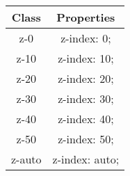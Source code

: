 \documentclass{report}
\begin{document}
    \pagebreak 
    \begin{center}
        \begin{tabular}{c|c}
            Class &Properties \\ 
            \hline
            z-0	&z-index: 0;\\
            z-10	&z-index: 10;\\
            z-20	&z-index: 20;\\
            z-30	&z-index: 30;\\
            z-40	&z-index: 40;\\
            z-50	&z-index: 50;\\
            z-auto	&z-index: auto;
        \end{tabular}
    \end{center}
\end{document}
